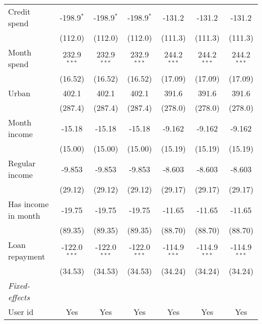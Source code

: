 \begin{table}[htbp]
\begin{threeparttable}[b]
\begin{tabular}{lcccccc}
         Credit spend              & -198.9$^{*}$   & -198.9$^{*}$   & -198.9$^{*}$   & -131.2         & -131.2          & -131.2\\   
                                   & (112.0)        & (112.0)        & (112.0)        & (111.3)        & (111.3)         & (111.3)\\   
         Month spend               & 232.9$^{***}$  & 232.9$^{***}$  & 232.9$^{***}$  & 244.2$^{***}$  & 244.2$^{***}$   & 244.2$^{***}$\\   
                                   & (16.52)        & (16.52)        & (16.52)        & (17.09)        & (17.09)         & (17.09)\\   
         Urban                     & 402.1          & 402.1          & 402.1          & 391.6          & 391.6           & 391.6\\   
                                   & (287.4)        & (287.4)        & (287.4)        & (278.0)        & (278.0)         & (278.0)\\   
         Month income              & -15.18         & -15.18         & -15.18         & -9.162         & -9.162          & -9.162\\   
                                   & (15.00)        & (15.00)        & (15.00)        & (15.19)        & (15.19)         & (15.19)\\   
         Regular income            & -9.853         & -9.853         & -9.853         & -8.603         & -8.603          & -8.603\\   
                                   & (29.12)        & (29.12)        & (29.12)        & (29.17)        & (29.17)         & (29.17)\\   
         Has income in month       & -19.75         & -19.75         & -19.75         & -11.65         & -11.65          & -11.65\\   
                                   & (89.35)        & (89.35)        & (89.35)        & (88.70)        & (88.70)         & (88.70)\\   
         Loan repayment            & -122.0$^{***}$ & -122.0$^{***}$ & -122.0$^{***}$ & -114.9$^{***}$ & -114.9$^{***}$  & -114.9$^{***}$\\   
                                   & (34.53)        & (34.53)        & (34.53)        & (34.24)        & (34.24)         & (34.24)\\   
         \midrule
         \emph{Fixed-effects}\\
         User id                   & Yes            & Yes            & Yes            & Yes            & Yes             & Yes\\  

\end{tabular}
\end{threeparttable}
\end{table}
